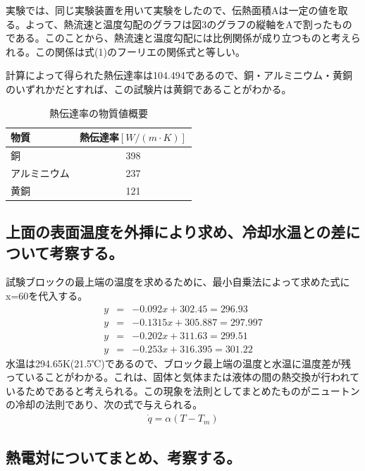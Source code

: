 \documentclass[a4j,twoside,openright,11pt]{jarticle}
\begin{document}
実験では、同じ実験装置を用いて実験をしたので、伝熱面積Aは一定の値を取る。よって、熱流速と温度勾配のグラフは図3のグラフの縦軸をAで割ったものである。このことから、熱流速と温度勾配には比例関係が成り立つものと考えられる。この関係は式(1)のフーリエの関係式と等しい。

計算によって得られた熱伝達率は104.494であるので、銅・アルミニウム・黄銅のいずれかだとすれば、この試験片は黄銅であることがわかる。
\begin{table}[htb]
\begin{center}
  \caption{熱伝達率の物質値概要}
  \begin{tabular}{lc}
    物質&熱伝達率$[W/(m\cdot K)]$\\
\hline
    銅&398\\
    アルミニウム&237\\
    黄銅&121\\
\hline
  \end{tabular}
\end{center}
\end{table}

\subsection{上面の表面温度を外挿により求め、冷却水温との差について考察する。}
試験ブロックの最上端の温度を求めるために、最小自乗法によって求めた式にx=60を代入する。
\begin{eqnarray}
y&=&-0.092x+302.45 = 296.93\\
y&=&-0.1315x+305.887 = 297.997\\
y&=&-0.202x+311.63 = 299.51\\
y&=&-0.253x+316.395 = 301.22
\end{eqnarray}
水温は294.65K(21.5℃)であるので、ブロック最上端の温度と水温に温度差が残っていることがわかる。これは、固体と気体または液体の間の熱交換が行われているためであると考えられる。この現象を法則としてまとめたものがニュートンの冷却の法則であり、次の式で与えられる。
\begin{eqnarray}
  \dot{q} =\alpha (T-T_m)
\end{eqnarray}

\subsection{熱電対についてまとめ、考察する。}
\end{document}
